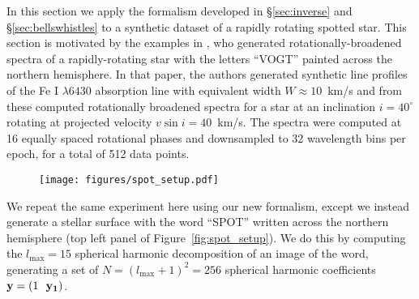 \documentclass[modern]{aastex62}
\begin{document}
In this section we apply the formalism developed in \S\ref{sec:inverse}
and \S\ref{sec:bellswhistles} to a synthetic dataset of a rapidly
rotating spotted star. This section is motivated by the
examples in \cite{Vogt1987}, who generated rotationally-broadened spectra
of a rapidly-rotating star with the letters ``VOGT'' painted across 
the northern hemisphere. In that paper, the authors
generated synthetic line profiles of the Fe I 
$\lambda 6430$ absorption line with equivalent width $W \approx 10$~km/s
and from these computed rotationally broadened spectra for a star at an 
inclination $i=40^\circ$ rotating at projected velocity $v\sin i = 40$~km/s.
The spectra were computed at 16 equally spaced rotational phases and
downsampled to 32 wavelength bins per epoch, for a total of 512 data
points. 

\begin{figure}[t!]
    \begin{centering} 
    \texttt{[image: figures/spot\_setup.pdf]}
    \end{centering}
\end{figure}

We repeat the same experiment here using our new formalism, except we
instead generate a stellar surface with the word ``SPOT'' written across
the northern hemisphere (top left panel of Figure~\ref{fig:spot_setup}).
We do this by computing the $l_\mathrm{max} = 15$ spherical harmonic
decomposition of an image of the word, generating a set of 
$N = (l_\mathrm{max} + 1)^2 = 256$ spherical harmonic coefficients 
$\bvec{y} = (1 \quadquad \bvec{y_1})$.
\end{document}
